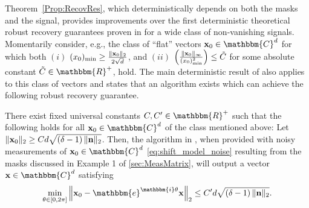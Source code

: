 Theorem~\ref{Prop:RecovRes}, which deterministically depends on both the masks and the signal, provides improvements over the first deterministic theoretical robust recovery guarantees proven in \cite{IVW2015_FastPhase} for a wide class of non-vanishing signals.  Momentarily consider, e.g., the class of ``flat'' vectors $\x_0 \in \mathbbm{C}^d$ for which both $(i)$ $(x_0)_{\rm min} \geq \frac{\| \mathbf x_0 \|_2}{2 \sqrt{d}}$, and $(ii)$ $\left( \frac{\Vert \mathbf x_0 \Vert_{\infty}}{(x_0)^2_{\rm min}} \right) \leq \tilde{C}$ for some absolute constant $\tilde{C} \in \mathbbm{R}^+$, hold.  The main deterministic result of \cite{IVW2015_FastPhase} also applies to this class of vectors and states that an algorithm exists which can achieve the following robust recovery guarantee.

\begin{theorem}
There exist fixed universal constants $C,C' \in \mathbbm{R}^+$ such that the following holds for all $\x_0 \in \mathbbm{C}^d$ of the class mentioned above:  Let 
$\| \mathbf x_0 \|_2 \geq C d  \sqrt{\left(\delta - 1 \right)\| \mathbf n \|_2}$.  Then, the  algorithm in \cite{IVW2015_FastPhase}, when provided with noisy measurements of $\x_0 \in \mathbbm{C}^d$ \eqref{eq:shift_model_noise} resulting from the masks discussed in Example 1 of \cref{sec:MeasMatrix}, will output a vector  $\x \in \mathbbm{C}^d$ satisfying
\[ \min_{\theta \in [0, 2 \pi]} \left\Vert  \x_0 - \mathbbm{e}^{\mathbbm{i} \theta} \x \right\Vert_2 \leq C' d  \sqrt{\left(\delta - 1 \right)\| \n \|_2 }.\]
\label{Thm:OLDRecovRes}
\end{theorem}

